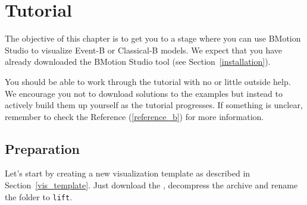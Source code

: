 \section{Tutorial}
\label{tutorial_b}

The objective of this chapter is to get you to a stage where you can use BMotion Studio to visualize Event-B or Classical-B models. 
We expect that you have already downloaded the BMotion Studio tool (see Section~\ref{installation}).
 
You should be able to work through the tutorial with no or little outside help.
We encourage you not to download solutions to the examples but instead to actively build them up yourself as the tutorial progresses.
If something is unclear, remember to check the Reference (\ref{reference_b}) for more information.

\subsection{Preparation}

Let's start by creating a new visualization template as described in Section~\ref{vis_template}.
Just download the , decompress the archive and rename the folder to \texttt{lift}.

